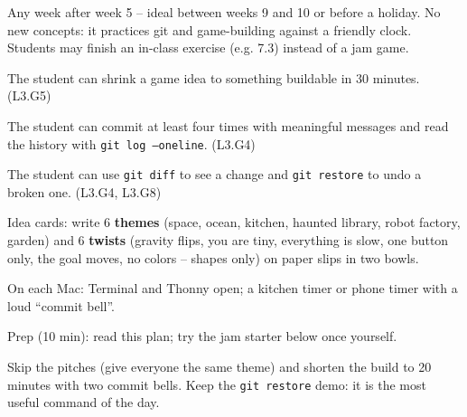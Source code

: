 
\begin{teachernote}
Any week after week 5 -- ideal between weeks 9 and 10 or before a holiday. No new concepts: it practices git and game-building against a friendly clock. Students may finish an in-class exercise (e.g. 7.3) instead of a jam game.
\end{teachernote}

\begin{objectives}
  \item The student can shrink a game idea to something buildable in 30 minutes. (L3.G5)
  \item The student can commit at least four times with meaningful messages and read the history with \texttt{git log --oneline}. (L3.G4)
  \item The student can use \texttt{git diff} to see a change and \texttt{git restore} to undo a broken one. (L3.G4, L3.G8)
\end{objectives}

\begin{materials}
  \item Idea cards: write 6 \textbf{themes} (space, ocean, kitchen, haunted library, robot factory, garden) and 6 \textbf{twists} (gravity flips, you are tiny, everything is slow, one button only, the goal moves, no colors -- shapes only) on paper slips in two bowls.
  \item On each Mac: Terminal and Thonny open; a kitchen timer or phone timer with a loud \enquote{commit bell}.
  \item Prep (10 min): read this plan; try the jam starter below once yourself.
\end{materials}

\begin{timeplan}
\end{timeplan}
\begin{teachernote}
Skip the pitches (give everyone the same theme) and shorten the build to 20 minutes with two commit bells. Keep the \texttt{git restore} demo: it is the most useful command of the day.
\end{teachernote}

